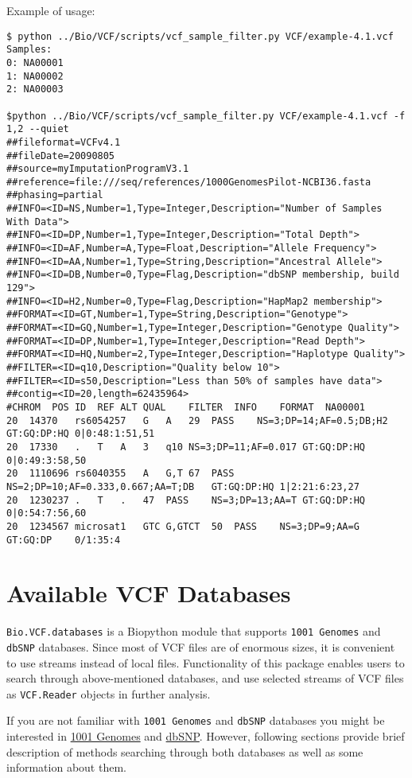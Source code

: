 \noindent Example of usage:
\begin{verbatim}
$ python ../Bio/VCF/scripts/vcf_sample_filter.py VCF/example-4.1.vcf
Samples:
0: NA00001
1: NA00002
2: NA00003

$python ../Bio/VCF/scripts/vcf_sample_filter.py VCF/example-4.1.vcf -f 1,2 --quiet
##fileformat=VCFv4.1
##fileDate=20090805
##source=myImputationProgramV3.1
##reference=file:///seq/references/1000GenomesPilot-NCBI36.fasta
##phasing=partial
##INFO=<ID=NS,Number=1,Type=Integer,Description="Number of Samples With Data">
##INFO=<ID=DP,Number=1,Type=Integer,Description="Total Depth">
##INFO=<ID=AF,Number=A,Type=Float,Description="Allele Frequency">
##INFO=<ID=AA,Number=1,Type=String,Description="Ancestral Allele">
##INFO=<ID=DB,Number=0,Type=Flag,Description="dbSNP membership, build 129">
##INFO=<ID=H2,Number=0,Type=Flag,Description="HapMap2 membership">
##FORMAT=<ID=GT,Number=1,Type=String,Description="Genotype">
##FORMAT=<ID=GQ,Number=1,Type=Integer,Description="Genotype Quality">
##FORMAT=<ID=DP,Number=1,Type=Integer,Description="Read Depth">
##FORMAT=<ID=HQ,Number=2,Type=Integer,Description="Haplotype Quality">
##FILTER=<ID=q10,Description="Quality below 10">
##FILTER=<ID=s50,Description="Less than 50% of samples have data">
##contig=<ID=20,length=62435964>
#CHROM	POS	ID	REF	ALT	QUAL	FILTER	INFO	FORMAT	NA00001
20	14370	rs6054257	G	A	29	PASS	NS=3;DP=14;AF=0.5;DB;H2	GT:GQ:DP:HQ	0|0:48:1:51,51
20	17330	.	T	A	3	q10	NS=3;DP=11;AF=0.017	GT:GQ:DP:HQ	0|0:49:3:58,50
20	1110696	rs6040355	A	G,T	67	PASS	NS=2;DP=10;AF=0.333,0.667;AA=T;DB	GT:GQ:DP:HQ	1|2:21:6:23,27
20	1230237	.	T	.	47	PASS	NS=3;DP=13;AA=T	GT:GQ:DP:HQ	0|0:54:7:56,60
20	1234567	microsat1	GTC	G,GTCT	50	PASS	NS=3;DP=9;AA=G	GT:GQ:DP	0/1:35:4
\end{verbatim}   


\section{Available VCF Databases}

\noindent \verb|Bio.VCF.databases| is a Biopython module that supports \verb|1001 Genomes| and \verb|dbSNP| databases.
Since most of VCF files are of enormous sizes, it is convenient to use streams instead of local files.
Functionality of this package enables users to search through above-mentioned databases, and use selected streams
of VCF files as \verb|VCF.Reader| objects in further analysis.


\noindent If you are not familiar with \verb|1001 Genomes| and \verb|dbSNP| databases you might be interested in
\href{http://1001genomes.org/}{1001 Genomes} and \href{https://www.ncbi.nlm.nih.gov/SNP/}{dbSNP}. However, following
sections provide brief description of methods searching through both databases as well as some information about them.


